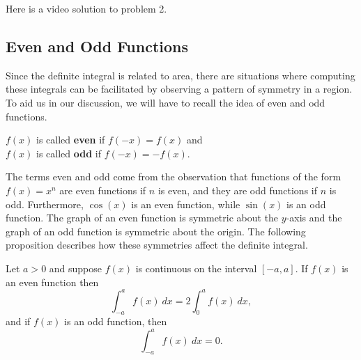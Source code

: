 \documentclass[handout]{ximera}
\begin{document}
Here is a video solution to problem 2.
\begin{foldable}
\end{foldable}

\subsection{Even and Odd Functions}
Since the definite integral is related to area, there are situations where 
computing these integrals can be facilitated by observing a pattern of symmetry 
in a region. To aid us in our discussion, we will have to recall the idea of 
even and odd functions.

\begin{definition}
$f(x)$ is called \textbf{even} if $f(-x) = f(x)$ and\\
$f(x)$ is called \textbf{odd} if $f(-x) = -f(x)$.
\end{definition}
The terms even and odd come from the observation that
functions of the form $f(x) = x^n$ are even functions if $n$ is even, and they are
odd functions if $n$ is odd. Furthermore, $\cos(x)$ is an even function, while $\sin(x)$ is an odd function.
The graph of an 
even function is symmetric about the $y$-axis and the graph of an odd function is symmetric about the origin.
The following proposition describes how these symmetries affect the definite integral.

\begin{proposition}
Let $a>0$ and suppose $f(x)$ is continuous on the interval $[-a, a]$.
If $f(x)$ is an even function then
\[\int_{-a}^a f(x) \ dx = 2 \int_0^a f(x) \ dx,\]
and if $f(x)$ is an odd function, then 
\[\int_{-a}^a f(x) \ dx = 0.\]
\end{proposition}  

%

\begin{image}
\end{image}
\end{document}
